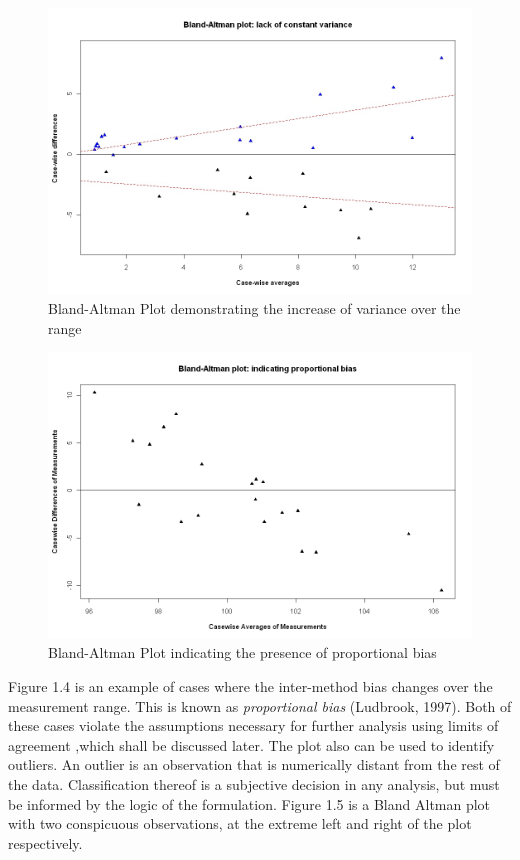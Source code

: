 \documentclass[12pt, a4paper]{report}
\begin{document}
	
	\begin{figure}[h!]
		\begin{center}
			\includegraphics[width=125mm]{images/BAFanEffect.jpeg}
			\caption{Bland-Altman Plot demonstrating the increase of variance over the range}\label{BAFanEffect}
		\end{center}
	\end{figure}
	
	\begin{figure}[h!]
		\begin{center}
			\includegraphics[width=125mm]{images/PropBias.jpeg}
			\caption{Bland-Altman Plot indicating the presence of proportional bias}\label{PropBias}
		\end{center}
	\end{figure}
	
	\newpage
	Figure 1.4 is an example of cases where the inter-method bias
	changes over the measurement range. This is known as\textit{ proportional
		bias} (Ludbrook, 1997). Both of these cases violate the assumptions
	necessary for further analysis using limits of agreement ,which
	shall be discussed later. The plot also can be used to identify
	outliers. An outlier is an observation that is numerically distant
	from the rest of the data. Classification thereof is a subjective
	decision in any analysis, but must be informed by the logic of the
	formulation. Figure 1.5 is a Bland Altman plot with two
	conspicuous observations, at the extreme left and right of the
	plot respectively.
	
\end{document}
